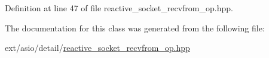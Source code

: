 Definition at line 47 of file reactive\+\_\+socket\+\_\+recvfrom\+\_\+op.\+hpp.



The documentation for this class was generated from the following file\+:\begin{DoxyCompactItemize}
\item 
ext/asio/detail/\hyperlink{reactive__socket__recvfrom__op_8hpp}{reactive\+\_\+socket\+\_\+recvfrom\+\_\+op.\+hpp}\end{DoxyCompactItemize}
